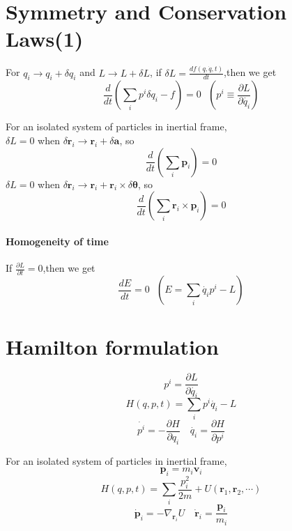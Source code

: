 \section{Symmetry and Conservation Laws(1)}
\begin{newthem}
For $q_i \to q_i+\delta q_i$ and $L \to L+\delta L$, if $\delta L= \frac{d f(q,\dot{q},t)}{dt}$,then we get
\[\frac{d}{dt}(\sum_i p^i \delta q_i-f)=0 \ \ \ (p^i  \equiv  \frac{\partial L}{\partial \dot{q_i}})\]
\end{newthem}
\begin{example}
For an isolated system of particles in inertial frame,\\ 
$\delta L = 0$ when $\delta \bm{r}_i \rightarrow \bm{r}_i + \delta \bm{a}$, so
\[\frac{d}{dt} (\sum_i \bm{p}_i) = 0\]
$\delta L = 0$ when $\delta \bm{r}_i \rightarrow \bm{r}_i + \bm{r}_i \times \delta \bm{\theta}$, so
\[\frac{d}{dt} (\sum_i \bm{r}_i \times \bm{p}_i) = 0\]
\end{example}

\paragraph{Homogeneity of time}
If $\frac{\partial L}{\partial t}=0$,then we get
\[\frac{dE}{dt}=0 \ \ \ (E=\sum_i \dot{q_i}p^i-L)\]

\section{Hamilton formulation}
\[p^i = \frac{\partial L}{\partial \dot{q_i}}\]
\[H(q,p,t)=\sum_i p^i \dot{q_i}-L\]
\[\dot{p^i}=-\frac{\partial H}{\partial q_i} \quad \dot{q_i}=\frac{\partial H}{\partial p^i}\]
\begin{example}
 For an isolated system of particles in inertial frame, 
\[\bm{p}_i = m_i \bm{v}_i\]
\[H(q,p,t)=\sum_i \frac{p_i^2}{2m} + U(\bm{r}_1,\bm{r}_2,\cdots)\]
\[\dot{\bm{p}}_i =-\nabla_{\bm{r}_i} U \quad \dot{\bm{r}}_i = \frac{\bm{p}_i}{m_i}\]
\end{example}
 
